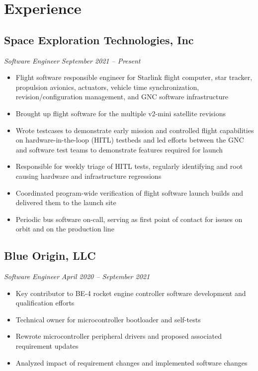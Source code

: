\documentclass{article}
\begin{document}
\section{Experience}

\subsection{\textbf{Space Exploration Technologies, Inc}}
\raggedleft\textit{Software Engineer} \hfill \textit{September 2021 -- Present}
\begin{itemize}
    \item Flight software responsible engineer for Starlink flight computer, star tracker, propulsion avionics, actuators, vehicle time synchronization, revision/configuration management, and GNC software infrastructure
    \item Brought up flight software for the multiple v2-mini satellite revisions
    \item Wrote testcases to demonstrate early mission and controlled flight capabilities on hardware-in-the-loop (HITL) testbeds and led efforts between the GNC and software test teams to demonstrate features required for launch
    \item Responsible for weekly triage of HITL tests, regularly identifying and root causing hardware and infrastructure regressions
    \item Coordinated program-wide verification of flight software launch builds and delivered them to the launch site
    \item Periodic bus software on-call, serving as first point of contact for issues on orbit and on the production line
\end{itemize}

\bigskip

\subsection{\textbf{Blue Origin, LLC}}
\raggedleft\textit{Software Engineer} \hfill \textit{April 2020 -- September 2021}
\begin{itemize}
    \item Key contributor to BE-4 rocket engine controller software development and qualification efforts
    \item Technical owner for microcontroller bootloader and self-tests
    \item Rewrote microcontroller peripheral drivers and proposed associated requirement updates
    \item Analyzed impact of requirement changes and implemented software changes
\end{itemize}
\end{document}
